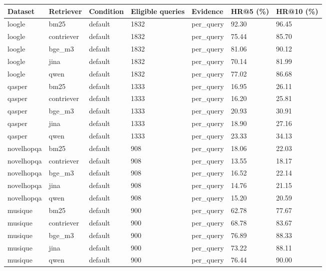 \begin{tabular}{lllllll}
\hline
Dataset & Retriever & Condition & Eligible queries & Evidence & HR@5 (\%) & HR@10 (\%) \\
\hline
loogle & bm25 & default & 1832 & per\_query & 92.30 & 96.45 \\
loogle & contriever & default & 1832 & per\_query & 75.44 & 85.70 \\
loogle & bge\_m3 & default & 1832 & per\_query & 81.06 & 90.12 \\
loogle & jina & default & 1832 & per\_query & 70.14 & 81.99 \\
loogle & qwen & default & 1832 & per\_query & 77.02 & 86.68 \\
qasper & bm25 & default & 1333 & per\_query & 16.95 & 26.11 \\
qasper & contriever & default & 1333 & per\_query & 16.20 & 25.81 \\
qasper & bge\_m3 & default & 1333 & per\_query & 20.93 & 30.91 \\
qasper & jina & default & 1333 & per\_query & 18.90 & 27.16 \\
qasper & qwen & default & 1333 & per\_query & 23.33 & 34.13 \\
novelhopqa & bm25 & default & 908 & per\_query & 18.06 & 22.03 \\
novelhopqa & contriever & default & 908 & per\_query & 13.55 & 18.17 \\
novelhopqa & bge\_m3 & default & 908 & per\_query & 16.52 & 22.14 \\
novelhopqa & jina & default & 908 & per\_query & 14.76 & 21.15 \\
novelhopqa & qwen & default & 908 & per\_query & 15.20 & 20.59 \\
musique & bm25 & default & 900 & per\_query & 62.78 & 77.67 \\
musique & contriever & default & 900 & per\_query & 68.78 & 83.67 \\
musique & bge\_m3 & default & 900 & per\_query & 76.89 & 88.33 \\
musique & jina & default & 900 & per\_query & 73.22 & 88.11 \\
musique & qwen & default & 900 & per\_query & 76.44 & 90.00 \\
\hline
\end{tabular}
